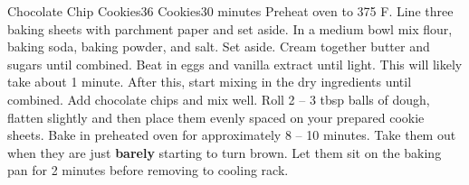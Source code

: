 \documentclass[../main.tex]{subfiles}
\begin{document}
\begin{recipe}{Chocolate Chip Cookies}{36 Cookies}{30 minutes}
    Preheat oven to 375 \degrees{}F. Line three baking sheets with parchment
    paper and set aside.
    In a medium bowl mix flour, baking soda, baking powder, and salt. Set
    aside.
    Cream together butter and sugars until combined.
    Beat in eggs and vanilla extract until light. This will likely take about 1
    minute. After this, start mixing in the dry ingredients until combined.
    Add chocolate chips and mix well. Roll 2 -- 3 tbsp balls of dough, flatten
    slightly and then place them evenly spaced on your prepared cookie sheets.
    Bake in preheated oven for approximately 8 -- 10 minutes. Take them out
    when they are just \textbf{barely} starting to turn brown. Let them sit on
    the baking pan for 2 minutes before removing to cooling rack.

\end{recipe}
\end{document}
